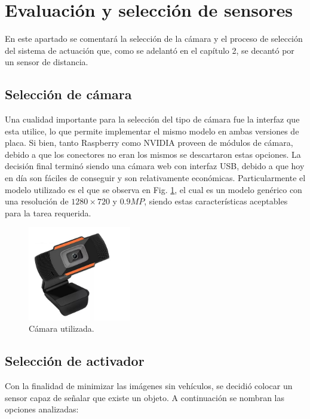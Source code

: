 \section{Evaluación y selección de sensores}

En este apartado se comentará la selección de la cámara y el proceso de selección del sistema de actuación que, como se adelantó en el capítulo 2, se decantó por un sensor de distancia.

\subsection{Selección de cámara}

Una cualidad importante para la selección del tipo de cámara fue la interfaz que esta utilice, lo que permite implementar el mismo modelo en ambas versiones de placa.
Si bien, tanto Raspberry como NVIDIA proveen de módulos de cámara, debido a que los conectores no eran los mismos se descartaron estas opciones. La decisión final terminó siendo una cámara web con interfaz USB, debido a que hoy en día son fáciles de conseguir y son relativamente económicas. Particularmente el modelo utilizado es el que se observa en Fig. \ref{fig:camara-usb}, el cual es un modelo genérico con una resolución de $1280 \times 720$ y $0.9MP$, siendo estas características aceptables para la tarea requerida.

\begin{figure}
    \centering
    \includegraphics[width=0.4\textwidth]{imgs/camara-usb.jpg}
    \caption{Cámara utilizada.}
    \label{fig:camara-usb}
\end{figure}

\subsection{Selección de activador}

Con la finalidad de minimizar las imágenes sin vehículos, se decidió colocar un sensor capaz de señalar que existe un objeto. A continuación se nombran las opciones analizadas:

